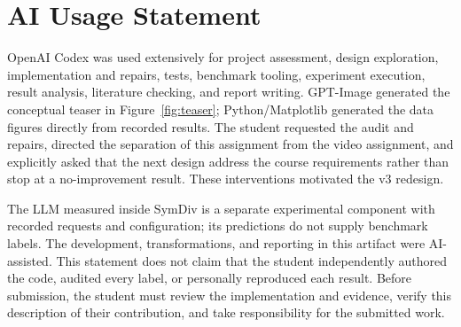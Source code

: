 \documentclass[sigconf]{acmart}
\begin{document}
\section*{AI Usage Statement}
OpenAI Codex was used extensively for project assessment, design exploration,
implementation and repairs, tests, benchmark tooling, experiment execution,
result analysis, literature checking, and report writing. GPT-Image generated the conceptual teaser in Figure~\ref{fig:teaser}; Python/Matplotlib generated the data figures directly from recorded results. The student
requested the audit and repairs, directed the separation of this assignment
from the video assignment, and explicitly asked that the next design
address the course requirements rather than stop at a no-improvement result.
These interventions motivated the v3 redesign.

The LLM measured inside SymDiv is a separate experimental component
with recorded requests and configuration; its predictions do not supply
benchmark labels. The development, transformations, and reporting in this
artifact were AI-assisted. This statement does not claim that the student
independently authored the code, audited every label, or personally
reproduced each result. Before submission, the student must review the
implementation and evidence, verify this description of their contribution,
and take responsibility for the submitted work.

\clearpage

\begingroup
\raggedright

\endgroup
\end{document}
